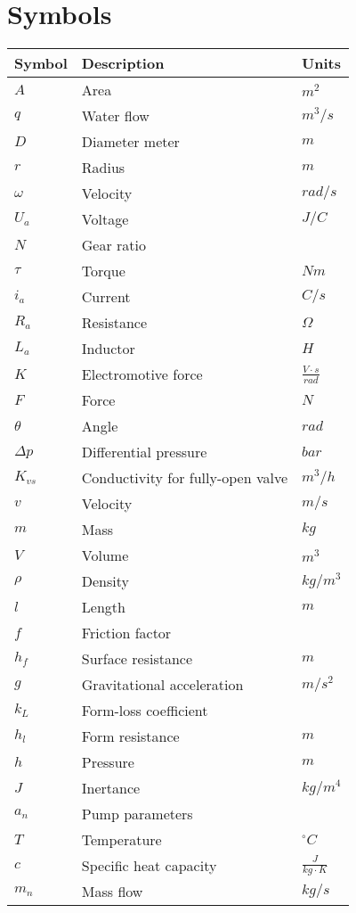 \section*{Symbols}
\begin{longtable}[H]{p{80pt} p{280pt} p{50pt}} 
\textbf{Symbol}	& \textbf{Description} & \textbf{Units}  \\ \hline
$A$ & Area & $m^2$ \\ 
$q$ & Water flow & $m^3/s$ \\ 
$D$ & Diameter meter & $m$ \\ 
$r$ & Radius & $m$ \\ 
$\omega$ & Velocity & $rad/s$ \\ 
$U_a$ & Voltage & $J/C$ \\ 
$N$ & Gear ratio & $ $ \\ 
$\tau$ & Torque & $Nm$ \\ 
$i_a$ & Current & $C/s$ \\ 
$R_a$ & Resistance & $\Omega$ \\ 
$L_a$ & Inductor & $H$ \\ 
$K$ & Electromotive force & $\frac{V \cdot s}{rad}$ \\ 
$F$ & Force & $N$ \\ 
$\theta$ & Angle & $rad$ \\ 
$\Delta p$ & Differential pressure & $bar$ \\ 
$K_{vs}$ & Conductivity for fully-open valve & $m^3/h$ \\ 
$v$ & Velocity & $m/s$ \\ 
$m$ & Mass & $kg$ \\
$V$ & Volume & $m^3$ \\
$\rho$ & Density & $kg/m^3$ \\
$l$ & Length & $m$ \\
$f$ & Friction factor & $ $ \\
$h_f $ & Surface resistance & $m$ \\
$g$ & Gravitational acceleration & $m/s^2$ \\
$k_L$ & Form-loss coefficient & $ $ \\
$h_l$ & Form resistance & $m$ \\
$h$ & Pressure & $m$ \\
$J$ & Inertance & $kg/m^4$ \\
$a_n$ & Pump parameters & $ $ \\
$T$ & Temperature & $^{\circ}C$ \\
$c$ & Specific heat capacity & $\frac{J}{kg\cdot K}$ \\
$m_n$ & Mass flow & $kg/s$ \\

\end{longtable}


